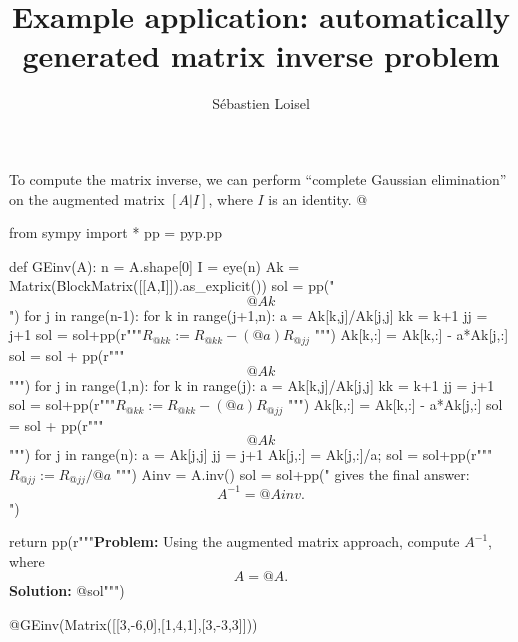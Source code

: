 \documentclass{article}
\author{Sébastien Loisel}
\title{Example application: automatically generated matrix inverse problem}
\date{}
\begin{document}
\maketitle

To compute the matrix inverse, we can perform ``complete Gaussian elimination'' on the augmented matrix $[A|I]$, where $I$ is an identity.
@{{{
from sympy import *
pp = pyp.pp

def GEinv(A):
    n = A.shape[0]
    I = eye(n)
    Ak = Matrix(BlockMatrix([[A,I]]).as_explicit())
    sol = pp("$$@Ak$$\n")
    for j in range(n-1):
        for k in range(j+1,n):
             a = Ak[k,j]/Ak[j,j]
             kk = k+1
             jj = j+1
             sol = sol+pp(r"""$R_{@kk} := R_{@kk} - (@a) R_{@jj}$ """)
             Ak[k,:] = Ak[k,:] - a*Ak[j,:]
        sol = sol + pp(r"""$$@Ak$$""")
    for j in range(1,n):
        for k in range(j):
            a = Ak[k,j]/Ak[j,j]
            kk = k+1
            jj = j+1
            sol = sol+pp(r"""$R_{@kk} := R_{@kk} - (@a) R_{@jj}$ """)
            Ak[k,:] = Ak[k,:] - a*Ak[j,:]
        sol = sol + pp(r"""$$@Ak$$""")
    for j in range(n):
        a = Ak[j,j]
        jj = j+1
        Ak[j,:] = Ak[j,:]/a;
        sol = sol+pp(r"""$R_{@jj} := R_{@jj}/@a$ """)
    Ainv = A.inv()
    sol = sol+pp(" gives the final answer:\n$$A^{-1} = @Ainv.$$\n")
            
    return pp(r"""{\bf Problem:} Using the augmented matrix approach, 
    compute $A^{-1}$, where $$A = @A.$$ 
    {\bf Solution:} 
    @sol""")
}}}

@{GEinv(Matrix([[3,-6,0],[1,4,1],[3,-3,3]]))}
\end{document}
